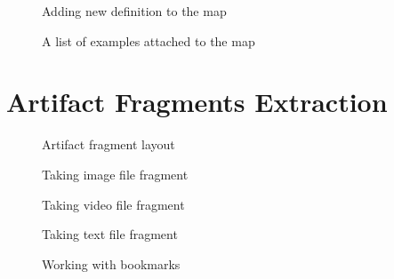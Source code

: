 \begin{figure}[ht!]
\centering
\setlength\fboxsep{0pt}
\setlength\fboxrule{0.5pt}
\caption{Adding new definition to the map}
\end{figure}

\begin{figure}[ht!]
\centering
\setlength\fboxsep{0pt}
\setlength\fboxrule{0.5pt}
\caption{A list of examples attached to the map}
\end{figure}

\FloatBarrier

\section{Artifact Fragments Extraction}
 
\begin{figure}[ht!]
\centering
\setlength\fboxsep{0pt}
\setlength\fboxrule{0.5pt}
\caption{Artifact fragment layout}
\end{figure}

\begin{figure}[htb]
\centering
\setlength\fboxsep{0pt}
\setlength\fboxrule{0.5pt}
\caption{Taking image file fragment}
\end{figure}

\begin{figure}[htb]
\centering
\setlength\fboxsep{0pt}
\setlength\fboxrule{0.5pt}
\caption{Taking video file fragment}
\end{figure}

\begin{figure}[htb]
\centering
\setlength\fboxsep{0pt}
\setlength\fboxrule{0.5pt}
\caption{Taking text file fragment}
\end{figure}

\begin{figure}[htb]
\centering
\setlength\fboxsep{0pt}
\setlength\fboxrule{0.5pt}
\caption{Working with bookmarks}
\end{figure}

\FloatBarrier

